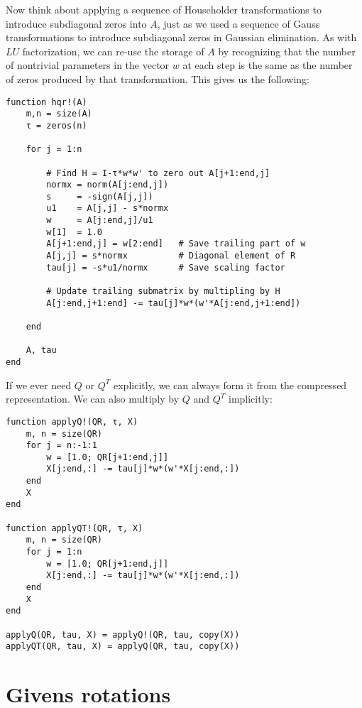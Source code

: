 \documentclass[12pt, leqno]{article}
\begin{document}
Now think about applying a sequence of Householder transformations to
introduce subdiagonal zeros into $A$, just as we used a sequence of Gauss
transformations to introduce subdiagonal zeros in Gaussian elimination.
%
%
As with $LU$ factorization, we can re-use the storage of $A$ by recognizing
that the number of nontrivial parameters in the vector $w$ at each step
is the same as the number of zeros produced by that transformation.
This gives us the following:
\begin{lstlisting}
function hqr!(A)
	m,n = size(A)
	τ = zeros(n)

	for j = 1:n

		# Find H = I-τ*w*w' to zero out A[j+1:end,j]
		normx = norm(A[j:end,j])
		s     = -sign(A[j,j])
		u1    = A[j,j] - s*normx
		w     = A[j:end,j]/u1
		w[1]  = 1.0
		A[j+1:end,j] = w[2:end]   # Save trailing part of w
		A[j,j] = s*normx          # Diagonal element of R
		tau[j] = -s*u1/normx      # Save scaling factor

		# Update trailing submatrix by multipling by H
		A[j:end,j+1:end] -= tau[j]*w*(w'*A[j:end,j+1:end])

	end

	A, tau
end
\end{lstlisting}

If we ever need $Q$ or $Q^T$ explicitly, we can always form it from
the compressed representation.  We can also multiply by $Q$ and $Q^T$
implicitly:
\begin{lstlisting}
function applyQ!(QR, τ, X)
	m, n = size(QR)
	for j = n:-1:1
		w = [1.0; QR[j+1:end,j]]
		X[j:end,:] -= tau[j]*w*(w'*X[j:end,:])
	end
	X
end

function applyQT!(QR, τ, X)
	m, n = size(QR)
	for j = 1:n
		w = [1.0; QR[j+1:end,j]]
		X[j:end,:] -= tau[j]*w*(w'*X[j:end,:])
	end
	X
end

applyQ(QR, tau, X) = applyQ!(QR, tau, copy(X))
applyQT(QR, tau, X) = applyQ(QR, tau, copy(X))
\end{lstlisting}

\section*{Givens rotations}
\end{document}
